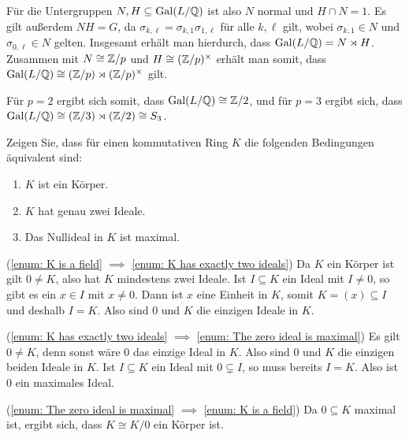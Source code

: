 \begin{solution}
  \begin{remark*}
    Für die Untergruppen $N, H \subseteq \operatorname{Gal}(L/\mathbb{Q})$ ist also $N$ normal und $H \cap N = 1$.
    Es gilt außerdem $NH = G$, da $\sigma_{k,\ell} = \sigma_{k,1} \sigma_{1,\ell}$ für alle $k, \ell$ gilt, wobei $\sigma_{k,1} \in N$ und $\sigma_{0,\ell} \in N$ gelten.
    Insgesamt erhält man hierdurch, dass $\operatorname{Gal}(L/\mathbb{Q}) = N \rtimes H$.
    Zusammen mit $N \cong \mathbb{Z}/p$ und $H \cong (\mathbb{Z}/p)^\times$ erhält man somit, dass $\operatorname{Gal}(L/\mathbb{Q}) \cong (\mathbb{Z}/p) \rtimes (\mathbb{Z}/p)^\times$ gilt.
    
    Für $p = 2$ ergibt sich somit, dass $\operatorname{Gal}(L/\mathbb{Q}) \cong \mathbb{Z}/2$, und für $p = 3$ ergibt sich, dass $\operatorname{Gal}(L/\mathbb{Q}) \cong (\mathbb{Z}/3) \rtimes (\mathbb{Z}/2) \cong S_3$.
  \end{remark*}  
\end{solution}


\begin{question}[subtitle = Charakterisierung von Körpern]
  \label{question: characterization of fields via its ideals}
  Zeigen Sie, dass für einen kommutativen Ring $K$ die folgenden Bedingungen äquivalent sind:
  \begin{enumerate}
    \item
      \label{enum: K is a field}
      $K$ ist ein Körper.
    \item
      \label{enum: K has exactly two ideals}
      $K$ hat genau zwei Ideale.
    \item
      \label{enum: The zero ideal is maximal}
      Das Nullideal in $K$ ist maximal.
  \end{enumerate}
\end{question}


\begin{solution}
  (\ref{enum: K is a field} $\implies$ \ref{enum: K has exactly two ideals})
  Da $K$ ein Körper ist gilt $0 \neq K$, also hat $K$ mindestens zwei Ideale.
  Ist $I \subseteq K$ ein Ideal mit $I \neq 0$, so gibt es ein $x \in I$ mit $x \neq 0$.
  Dann ist $x$ eine Einheit in $K$, somit $K = (x) \subseteq I$ und deshalb $I = K$.
  Also sind $0$ und $K$ die einzigen Ideale in $K$.
  
  (\ref{enum: K has exactly two ideals} $\implies$ \ref{enum: The zero ideal is maximal})
  Es gilt $0 \neq K$, denn sonst wäre $0$ das einzige Ideal in $K$.
  Also sind $0$ und $K$ die einzigen beiden Ideale in $K$.
  Ist $I \subseteq K$ ein Ideal mit $0 \subsetneq I$, so muss bereits $I = K$.
  Also ist $0$ ein maximales Ideal.
  
  (\ref{enum: The zero ideal is maximal} $\implies$ \ref{enum: K is a field})
  Da $0 \subseteq K$ maximal ist, ergibt sich, dass $K \cong K/0$ ein Körper ist.
\end{solution}


